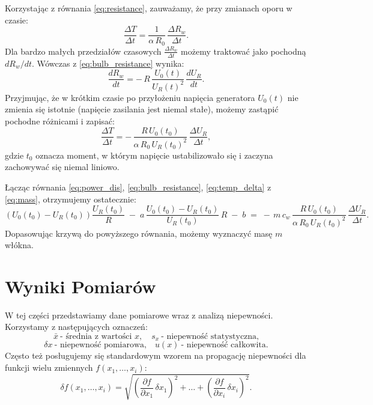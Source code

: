 \documentclass[12pt]{article}
\begin{document}
Korzystając z równania \eqref{eq:resistance}, zauważamy, że przy zmianach oporu w czasie:
\begin{equation}
    \frac{\Delta T}{\Delta t} = \frac{1}{\alpha\,R_0}\,\frac{\Delta R_w}{\Delta t}.
    \label{eq:temp_der}
\end{equation}
Dla bardzo małych przedziałów czasowych $\frac{\Delta R_w}{\Delta t}$ możemy traktować jako pochodną $d R_w / d t$. Wówczas z \eqref{eq:bulb_resistance} wynika:
\begin{equation}
    \frac{d R_w}{d t} = -\,R\,\frac{U_0(t)}{U_R(t)^2}\,\frac{d U_R}{dt}.
    \label{eq:bulb_der}
\end{equation}
Przyjmując, że w krótkim czasie po przyłożeniu napięcia generatora $U_0(t)$ nie zmienia się istotnie (napięcie zasilania jest niemal stałe), możemy zastąpić pochodne różnicami i zapisać:
\begin{equation}
    \frac{\Delta T}{\Delta t} = -\,\frac{R\,U_0(t_0)}{\alpha\,R_0\,U_R(t_0)^2}\,\frac{\Delta U_R}{\Delta t},
    \label{eq:temp_delta}
\end{equation}
gdzie $t_0$ oznacza moment, w którym napięcie ustabilizowało się i zaczyna zachowywać się niemal liniowo.

Łącząc równania \eqref{eq:power_dis}, \eqref{eq:bulb_resistance}, \eqref{eq:temp_delta} z \eqref{eq:mass}, otrzymujemy ostatecznie:
\begin{equation}
    (U_0(t_0) - U_R(t_0))\frac{U_R(t_0)}{R}
    \;-\;
    a\,\frac{U_0(t_0) - U_R(t_0)}{U_R(t_0)}\,R
    \;-\; b
    \;=\;
    -\,m\,c_w\,\frac{R\,U_0(t_0)}{\alpha\,R_0\,U_R(t_0)^2}\,\frac{\Delta U_R}{\Delta t}.
    \label{eq:final}
\end{equation}
Dopasowując krzywą do powyższego równania, możemy wyznaczyć masę $m$ włókna.

\section{Wyniki Pomiarów}
W tej części przedstawiamy dane pomiarowe wraz z analizą niepewności.  
Korzystamy z następujących oznaczeń:  
\[
    \bar{x} \ \text{- średnia z wartości }x,\quad s_x \ \text{- niepewność statystyczna,}
\]
\[
    \delta x \ \text{- niepewność pomiarowa,}\quad u(x) \ \text{- niepewność całkowita.}
\]
Często też posługujemy się standardowym wzorem na propagację niepewności dla funkcji wielu zmiennych $f(x_1,\ldots,x_i)$:
\begin{equation}
    \delta f(x_1,\ldots,x_i)
    = \sqrt{\left(\frac{\partial f}{\partial x_1}\,\delta x_1\right)^2 + \dots + \left(\frac{\partial f}{\partial x_i}\,\delta x_i\right)^2}.
    \label{eq:error_propagation}
\end{equation}
\end{document}
